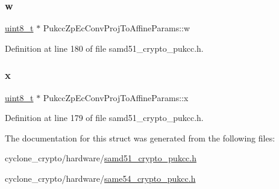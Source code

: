 \subsubsection{\texorpdfstring{w}{w}}
{\footnotesize\ttfamily \hyperlink{stdint_8h_aba7bc1797add20fe3efdf37ced1182c5}{uint8\+\_\+t} $\ast$ Pukcc\+Zp\+Ec\+Conv\+Proj\+To\+Affine\+Params\+::w}



Definition at line 180 of file samd51\+\_\+crypto\+\_\+pukcc.\+h.

\mbox{\label{structPukccZpEcConvProjToAffineParams_ab12cdac26be3a52042a7fb51d299a6b6}} 
\subsubsection{\texorpdfstring{x}{x}}
{\footnotesize\ttfamily \hyperlink{stdint_8h_aba7bc1797add20fe3efdf37ced1182c5}{uint8\+\_\+t} $\ast$ Pukcc\+Zp\+Ec\+Conv\+Proj\+To\+Affine\+Params\+::x}



Definition at line 179 of file samd51\+\_\+crypto\+\_\+pukcc.\+h.



The documentation for this struct was generated from the following files\+:\begin{DoxyCompactItemize}
\item 
cyclone\+\_\+crypto/hardware/\hyperlink{samd51__crypto__pukcc_8h}{samd51\+\_\+crypto\+\_\+pukcc.\+h}\item 
cyclone\+\_\+crypto/hardware/\hyperlink{same54__crypto__pukcc_8h}{same54\+\_\+crypto\+\_\+pukcc.\+h}\end{DoxyCompactItemize}
